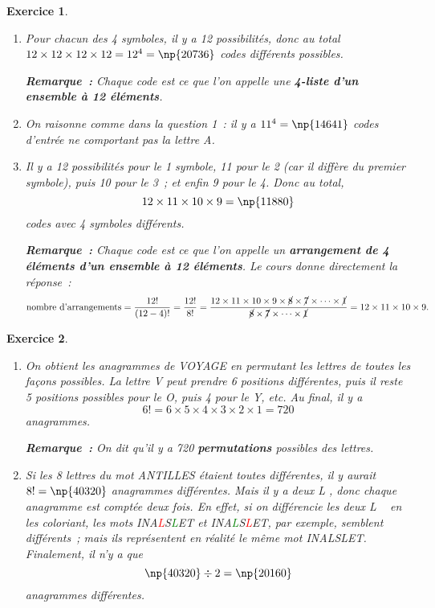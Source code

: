 \documentclass[10pt]{article}
\newtheorem{exo}{Exercice}
\begin{document}
\begin{exo}



\begin{enumerate}
\item Pour chacun des 4 symboles, il y a 12 possibilités, donc au total $12\times 12\times 12\times 12=12^4=\np{20736}$ codes différents possibles.

\medskip

\textbf{Remarque~:} Chaque code est ce que l'on appelle une \textbf{4-liste d'un ensemble à 12 éléments}.
\item On raisonne comme dans la question 1~: il y a $11^4=\np{14641}$ codes d'entrée ne comportant pas la lettre A.
\item Il y a 12 possibilités pour le 1 symbole, 11 pour le 2 (car il diffère du premier symbole), puis 10 pour le 3~; et enfin 9 pour le 4. Donc au total,
\[12\times 11\times 10\times 9=\np{11880}\] codes avec 4 symboles différents.

\medskip

\textbf{Remarque~:} Chaque code est ce que l'on appelle un \textbf{arrangement de 4 éléments d'un ensemble à 12 éléments}. Le cours donne directement la réponse~:
\[\text{nombre d'arrangements}=\frac{12!}{(12-4)!}=\frac{12!}{8!}=
\frac{12\times 11\times 10\times 9\times \cancel{8}\times \cancel{7}\times\cdots\times \cancel{1}}{\cancel{8}\times \cancel{7}\times\cdots\times \cancel{1}}=12\times 11\times 10\times 9.\]
\end{enumerate}

\end{exo}

\begin{exo}




\begin{enumerate}
\item On obtient les anagrammes de VOYAGE en permutant les lettres de toutes les façons possibles. La lettre V peut prendre 6 positions différentes, puis il reste 5 positions possibles pour le O, puis 4 pour le Y, etc. Au final, il y a
\[6!=6\times 5\times 4\times 3\times 2\times 1=720\] anagrammes.

\medskip

\textbf{Remarque~:} On dit qu'il y a 720 \textbf{permutations} possibles des lettres.
\item Si les 8 lettres du mot ANTILLES étaient toutes différentes, il y aurait $8!=\np{40320}$ anagrammes différentes. Mais il y a deux \og L \fg , donc chaque anagramme est comptée deux fois. En effet, si on différencie les deux \og L \fg~{} en les coloriant, les mots INA\textcolor{red}{L}S\textcolor{green}{L}ET et INA\textcolor{green}{L}S\textcolor{red}{L}ET, par exemple, semblent différents~; mais ils représentent en réalité le même mot INALSLET. Finalement, il n'y a que
\[\np{40320}\div 2=\np{20160}\] anagrammes différentes.
\end{enumerate}

\end{exo}
\end{document}
